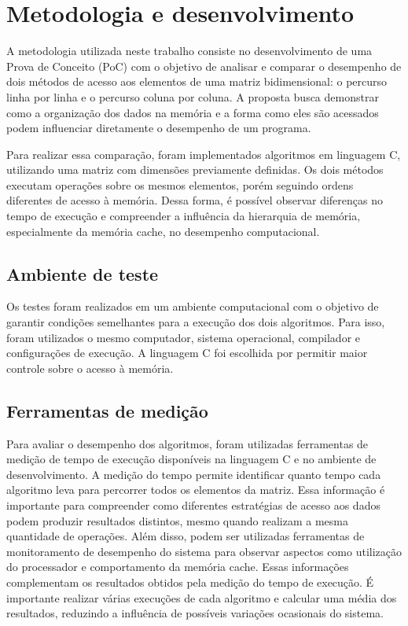 \chapter{Metodologia e desenvolvimento}
\label{cap:metodologia}

A metodologia utilizada neste trabalho consiste no desenvolvimento de uma Prova de Conceito (PoC) com o objetivo de analisar e comparar o desempenho de dois métodos de acesso aos elementos de uma matriz bidimensional: o percurso linha por linha e o percurso coluna por coluna. A proposta busca demonstrar como a organização dos dados na memória e a forma como eles são acessados podem influenciar diretamente o desempenho de um programa.

Para realizar essa comparação, foram implementados algoritmos em linguagem C, utilizando uma matriz com dimensões previamente definidas. Os dois métodos executam operações sobre os mesmos elementos, porém seguindo ordens diferentes de acesso à memória. Dessa forma, é possível observar diferenças no tempo de execução e compreender a influência da hierarquia de memória, especialmente da memória cache, no desempenho computacional.

\section{Ambiente de teste}
Os testes foram realizados em um ambiente computacional com o objetivo de garantir condições semelhantes para a execução dos dois algoritmos. Para isso, foram utilizados o mesmo computador, sistema operacional, compilador e configurações de execução. A linguagem C foi escolhida por permitir maior controle sobre o acesso à memória.

\section{Ferramentas de medição}
Para avaliar o desempenho dos algoritmos, foram utilizadas ferramentas de medição de tempo de execução disponíveis na linguagem C e no ambiente de desenvolvimento.
A medição do tempo permite identificar quanto tempo cada algoritmo leva para percorrer todos os elementos da matriz. Essa informação é importante para compreender como diferentes estratégias de acesso aos dados podem produzir resultados distintos, mesmo quando realizam a mesma quantidade de operações.
Além disso, podem ser utilizadas ferramentas de monitoramento de desempenho do sistema para observar aspectos como utilização do processador e comportamento da memória cache. Essas informações complementam os resultados obtidos pela medição do tempo de execução.
É importante realizar várias execuções de cada algoritmo e calcular uma média dos resultados, reduzindo a influência de possíveis variações ocasionais do sistema.

